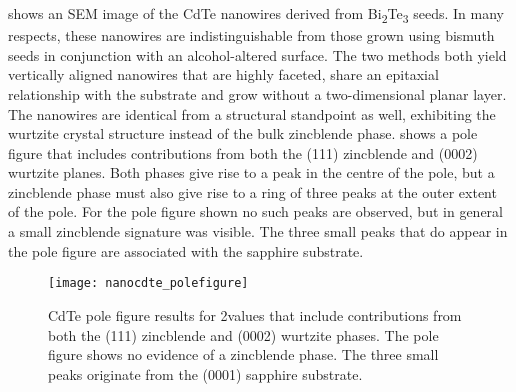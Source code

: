  shows an SEM image of the CdTe nanowires
derived from Bi\textsubscript{2}Te\textsubscript{3} seeds. In many respects, these nanowires
are indistinguishable from those grown using bismuth seeds
in conjunction with an alcohol-altered surface\cite{Neretina2007b}. The two
methods both yield vertically aligned nanowires that are highly
faceted, share an epitaxial relationship with the substrate and
grow without a two-dimensional planar layer. The nanowires
are identical from a structural standpoint as well, exhibiting
the wurtzite crystal structure instead of the bulk zincblende phase. 
shows a pole figure that includes contributions from both
the (111) zincblende and (0002) wurtzite planes. Both phases give rise to a peak in the
centre of the pole, but a zincblende phase must also give rise to
a ring of three peaks at the outer extent of the pole. For the pole
figure shown no such peaks are observed, but in general a small
zincblende signature was visible. The three small peaks that
do appear in the pole figure are associated with the sapphire
substrate.
\begin{figure}
    \centering
    \texttt{[image: nanocdte\_polefigure]}
    \caption[Pole figure of CdTe nanowires]{\label{fig:nanocdte_polefigure}CdTe pole figure results for 2\straighttheta{}values that include contributions from both the (111) zincblende and (0002) wurtzite phases. The pole figure shows no evidence of a zincblende phase. The three small peaks originate from the (0001) sapphire substrate.}
\end{figure}


